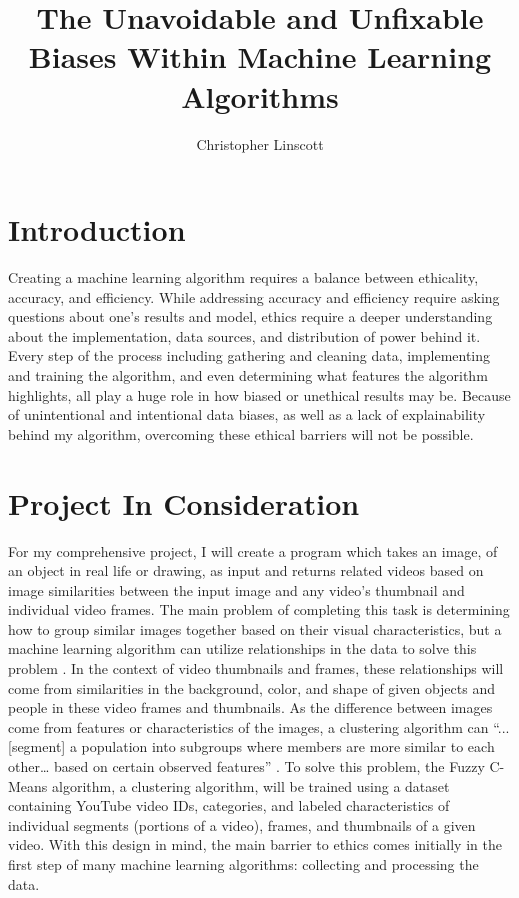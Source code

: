\documentclass[10pt,twocolumn]{article}
\title{The Unavoidable and Unfixable Biases Within Machine Learning Algorithms}
\author{Christopher Linscott}
\affiliation{Occidental College}
\begin{document}
\maketitle


\section {Introduction}

Creating a machine learning algorithm requires a balance between ethicality, accuracy, and efficiency. While addressing accuracy and efficiency require asking questions about one’s results and model, ethics require a deeper understanding about the implementation, data sources, and distribution of power behind it. Every step of the process including gathering and cleaning data, implementing and training the algorithm, and even determining what features the algorithm highlights, all play a huge role in how biased or unethical results may be. Because of unintentional and intentional data biases, as well as a lack of explainability behind my algorithm, overcoming these ethical barriers will not be possible.

\section {Project In Consideration}

For my comprehensive project, I will create a program which takes an image, of an object in real life or drawing, as input and returns related videos based on image similarities between the input image and any video’s thumbnail and individual video frames. The main problem of completing this task is determining how to group similar images together based on their visual characteristics, but a machine learning algorithm can utilize relationships in the data to solve this problem \cite{Fuchs2018}. In the context of video thumbnails and frames, these relationships will come from similarities in the background, color, and shape of given objects and people in these video frames and thumbnails. As the difference between images come from features or characteristics of the images, a clustering algorithm can “...[segment] a population into subgroups where members are more similar to each other… based on certain observed features” \cite{C3Clustering}. To solve this problem, the Fuzzy C-Means algorithm, a clustering algorithm, will be trained using a dataset containing YouTube video IDs, categories, and labeled characteristics of individual segments (portions of a video), frames, and thumbnails of a given video. With this design in mind, the main barrier to ethics comes initially in the first step of many machine learning algorithms: collecting and processing the data. 
\end{document}
